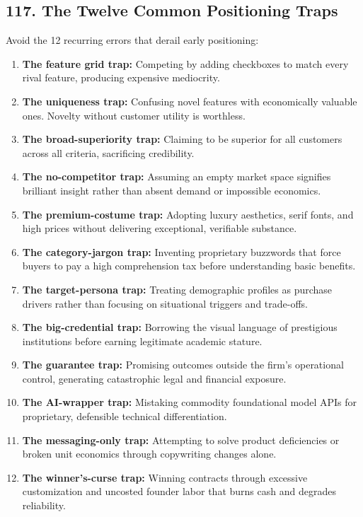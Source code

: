 \subsection*{117. The Twelve Common Positioning Traps}

Avoid the 12 recurring errors that derail early positioning:

\begin{enumerate}
    \item \textbf{The feature grid trap:} Competing by adding checkboxes to match every rival feature, producing expensive mediocrity.
    \item \textbf{The uniqueness trap:} Confusing novel features with economically valuable ones. Novelty without customer utility is worthless.
    \item \textbf{The broad-superiority trap:} Claiming to be superior for all customers across all criteria, sacrificing credibility.
    \item \textbf{The no-competitor trap:} Assuming an empty market space signifies brilliant insight rather than absent demand or impossible economics.
    \item \textbf{The premium-costume trap:} Adopting luxury aesthetics, serif fonts, and high prices without delivering exceptional, verifiable substance.
    \item \textbf{The category-jargon trap:} Inventing proprietary buzzwords that force buyers to pay a high comprehension tax before understanding basic benefits.
    \item \textbf{The target-persona trap:} Treating demographic profiles as purchase drivers rather than focusing on situational triggers and trade-offs.
    \item \textbf{The big-credential trap:} Borrowing the visual language of prestigious institutions before earning legitimate academic stature.
    \item \textbf{The guarantee trap:} Promising outcomes outside the firm's operational control, generating catastrophic legal and financial exposure.
    \item \textbf{The AI-wrapper trap:} Mistaking commodity foundational model APIs for proprietary, defensible technical differentiation.
    \item \textbf{The messaging-only trap:} Attempting to solve product deficiencies or broken unit economics through copywriting changes alone.
    \item \textbf{The winner's-curse trap:} Winning contracts through excessive customization and uncosted founder labor that burns cash and degrades reliability.
\end{enumerate}

